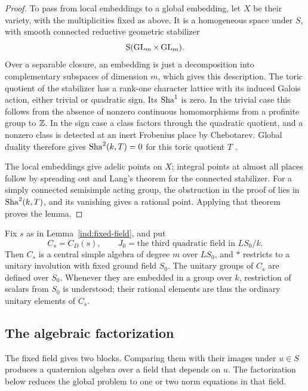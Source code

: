 \begin{proof}
To pass from local embeddings to a global embedding, let $X$ be their
variety, with the multiplicities fixed as above.  It is a homogeneous
space under $S$, with smooth connected reductive geometric stabilizer
\[
                  \mathrm{S}(\operatorname{GL}_m\times\operatorname{GL}_m).
\]
Over a separable closure, an embedding is just a decomposition into
complementary subspaces of dimension $m$, which gives this description.
The toric quotient of the stabilizer has a rank-one character lattice
with its induced Galois action, either trivial or quadratic sign.  Its
$\operatorname{Sha}^1$ is zero.  In the trivial case this follows from the absence of
nonzero continuous homomorphisms from a profinite group to $\mathbb Z$.
In the sign case a class factors through the quadratic quotient, and a
nonzero class is detected at an inert Frobenius place by Chebotarev.
Global duality therefore gives $\operatorname{Sha}^2(k,T)=0$ for this toric quotient
$T$ \cite[Theorem~5.2]{DemarcheHarariDuality}.

The local embeddings give adelic points on $X$; integral points at
almost all places follow by spreading out and Lang's theorem for the
connected stabilizer.  For a simply connected semisimple acting group,
the obstruction in the proof of
\cite[Theorem~2.5]{DemarcheHarariHomogeneous} lies in $\operatorname{Sha}^2(k,T)$, and
its vanishing gives a rational point.  Applying that theorem proves the
lemma.
\end{proof}

Fix $s$ as in Lemma~\ref{ind:fixed-field}, and put
\[
 C_s=C_D(s),\qquad J_0=\text{the third quadratic field in }LS_0/k.
\]
Then $C_s$ is a central simple algebra of degree $m$ over $LS_0$, and
$*$ restricts to a unitary involution with fixed ground field $S_0$.
The unitary groups of $C_s$ are defined over $S_0$.  Whenever they
are embedded in a group over $k$, restriction of scalars from $S_0$
is understood; their rational elements are thus the ordinary unitary
elements of $C_s$.

\subsection{The algebraic factorization}

The fixed field gives two blocks.  Comparing them with their images
under $u\in S$ produces a quaternion algebra over a field that depends
on $u$.  The factorization below reduces the global problem to one or
two norm equations in that field.

